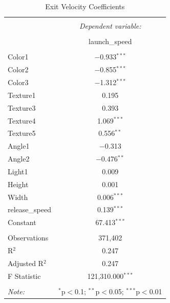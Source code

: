\documentclass{article}
\begin{document}
\begin{table}[!htbp] \centering 
  \caption{Exit Velocity Coefficients} 
  \label{} 
\begin{tabular}{@{\extracolsep{5pt}}lc} 
\\[-1.8ex]\hline 
\hline \\[-1.8ex] 
 & \multicolumn{1}{c}{\textit{Dependent variable:}} \\ 
\cline{2-2} 
\\[-1.8ex] & launch\_speed \\ 
\hline \\[-1.8ex] 
 Color1 & $-$0.933$^{***}$ \\ 
 
 Color2 & $-$0.855$^{***}$ \\ 
 
 Color3 & $-$1.312$^{***}$ \\ 
 
 Texture1 & 0.195 \\ 

 Texture3 & 0.393 \\ 

 Texture4 & 1.069$^{***}$ \\ 

 Texture5 & 0.556$^{**}$ \\ 

 Angle1 & $-$0.313 \\ 
 
 Angle2 & $-$0.476$^{**}$ \\ 

 Light1 & 0.009 \\ 
 
 Height & 0.001 \\ 
 
 Width & 0.006$^{***}$ \\ 

 release\_speed & 0.139$^{***}$ \\ 

 Constant & 67.413$^{***}$ \\ 
 
\hline \\[-1.8ex] 
Observations & 371,402 \\ 
R$^{2}$ & 0.247 \\ 
Adjusted R$^{2}$ & 0.247 \\ 
F Statistic & 121,310.000$^{***}$ \\ 
\hline 
\hline \\[-1.8ex] 
\textit{Note:}  & \multicolumn{1}{r}{$^{*}$p$<$0.1; $^{**}$p$<$0.05; $^{***}$p$<$0.01} \\ 
\end{tabular} 
\end{table}
\end{document}
